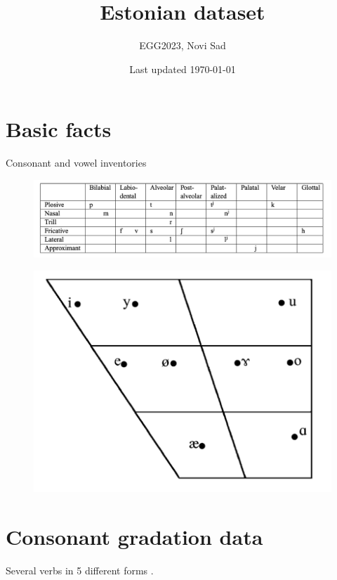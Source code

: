 \documentclass[a4paper, 12pt]{article}
\title{Estonian dataset}
\author{EGG2023, Novi Sad}
\date{Last updated \today}
\begin{document}
\maketitle

	\section{Basic facts}
	
	Consonant and vowel inventories \parencite{asu-teras2009}
	
	\begin{figure}[H]
		\includegraphics[scale=.6]{est-consonants}
	\end{figure}
		
	\begin{figure}[H]
		\includegraphics[scale=.5]{est-vowels}
	\end{figure}

	\section{Consonant gradation data}
	
	Several verbs in 5 different forms \parencite{problems}.
\end{document}
